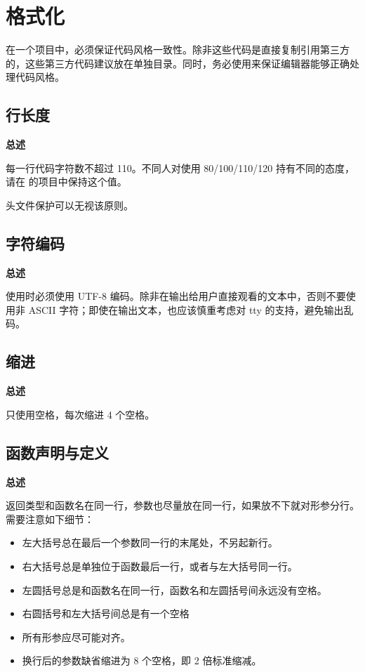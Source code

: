 \chapter{格式化}

在一个项目中，必须保证代码风格一致性。除非这些代码是直接复制引用第三方的，这些第三方代码建议放在单独目录。同时，务必使用来保证编辑器能够正确处理代码风格。

\section{行长度}

\textbf{总述}

每一行代码字符数不超过 110。不同人对使用 80/100/110/120 持有不同的态度，请在 \deepin 的项目中保持这个值。

\begin{DNote}
头文件保护可以无视该原则。
\end{DNote}

\section{字符编码}

\textbf{总述}

使用时必须使用 UTF-8 编码。除非在输出给用户直接观看的文本中，否则不要使用非 ASCII 字符；即使在输出文本，也应该慎重考虑对 tty 的支持，避免输出乱码。

\section{缩进}

\textbf{总述}

只使用空格，每次缩进 4 个空格。

\section{函数声明与定义}

\textbf{总述}

返回类型和函数名在同一行，参数也尽量放在同一行，如果放不下就对形参分行。需要注意如下细节：

\begin{itemize}
  \item 左大括号总在最后一个参数同一行的末尾处，不另起新行。
  \item 右大括号总是单独位于函数最后一行，或者与左大括号同一行。
  \item 左圆括号总是和函数名在同一行，函数名和左圆括号间永远没有空格。
  \item 右圆括号和左大括号间总是有一个空格
  \item 所有形参应尽可能对齐。
  \item 换行后的参数缺省缩进为 8 个空格，即 2 倍标准缩减。
\end{itemize}

